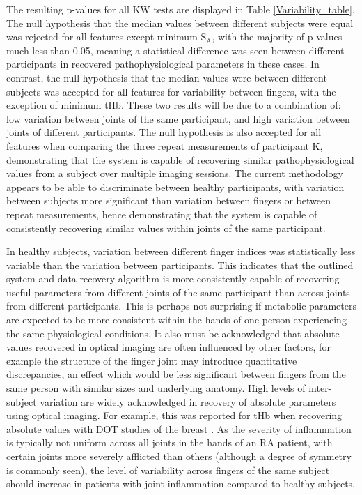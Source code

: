 \documentclass[twoside]{bhamthesis}
\theoremstyle{definition}
\begin{document}
The resulting p-values for all KW tests are displayed in Table \ref{Variability_table}. The null hypothesis that the median values between different subjects were equal was rejected for all features except minimum $\mathrm{S_A}$, with the majority of p-values much less than 0.05, meaning a statistical difference was seen between different participants in recovered pathophysiological parameters in these cases. In contrast, the null hypothesis that the median values were between different subjects was accepted for all features for variability between fingers, with the exception of minimum tHb. These two results will be due to a combination of: low variation between joints of the same participant, and high variation between joints of different participants. The null hypothesis is also accepted for all features when comparing the three repeat measurements of participant K, demonstrating that the system is capable of recovering similar pathophysiological values from a subject over multiple imaging sessions. The current methodology appears to be able to discriminate between healthy participants, with variation between subjects more significant than variation between fingers or between repeat measurements, hence demonstrating that the system is capable of consistently recovering similar values within joints of the same participant. 

In healthy subjects, variation between different finger indices was statistically less variable than the variation between participants. This indicates that the outlined system and data recovery algorithm is more consistently capable of recovering useful parameters from different joints of the same participant than across joints from different participants. This is perhaps not surprising if metabolic parameters are expected to be more consistent within the hands of one person experiencing the same physiological conditions. It also must be acknowledged that absolute values recovered in optical imaging are often influenced by other factors, for example the structure of the finger joint may introduce quantitative discrepancies, an effect which would be less significant between fingers from the same person with similar sizes and underlying anatomy. High levels of inter-subject variation are widely acknowledged in recovery of absolute parameters using optical imaging. For example, this was reported for tHb when recovering absolute values with DOT studies of the breast \cite{shah2001noninvasive,cubeddu2000effects}. As the severity of inflammation is typically not uniform across all joints in the hands of an RA patient, with certain joints more severely afflicted than others \cite{arnett1988american} (although a degree of symmetry is commonly seen), the level of variability across fingers of the same subject should increase in patients with joint inflammation compared to healthy subjects.
\end{document}
